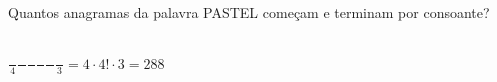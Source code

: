 \begin{ex}
 Quantos anagramas da palavra PASTEL começam e terminam por consoante?
   \begin{sol}
    \phantom{A} \\
    $\frac{\phantom{A}}{4}\frac{\phantom{A}}{\phantom{A}}\frac{\phantom{A}}{\phantom{A}}\frac{\phantom{A}}{\phantom{A}}\frac{\phantom{A}}{\phantom{A}}\frac{\phantom{A}}{3}=4\cdot4!\cdot3=288$
   \end{sol}
\end{ex}